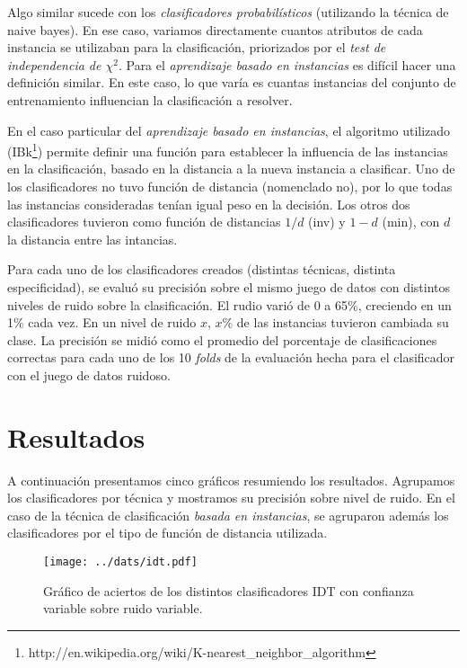 \documentclass[a4paper,10pt]{article}
\begin{document}
Algo similar sucede con los \emph{clasificadores probabilísticos} (utilizando la técnica de \textsf{naive bayes}). En ese caso, variamos directamente cuantos atributos de cada instancia se utilizaban para la clasificación, priorizados por el \emph{test de independencia de $\chi^2$}. Para el \emph{aprendizaje basado en instancias} es difícil hacer una definición similar. En este caso, lo que varía es cuantas instancias del conjunto de entrenamiento influencian la clasificación a resolver. 

En el caso particular del \emph{aprendizaje basado en instancias}, el algoritmo utilizado (\textsf{IBk}\footnote{http://en.wikipedia.org/wiki/K-nearest\_neighbor\_algorithm}) permite definir una función para establecer la influencia de las instancias en la clasificación, basado en la distancia a la nueva instancia a clasificar. Uno de los clasificadores no tuvo función de distancia (nomenclado \textsf{no}), por lo que todas las instancias consideradas tenían igual peso en la decisión. Los otros dos clasificadores tuvieron como función de distancias $1/d$ (\textsf{inv}) y $1-d$ (\textsf{min}), con $d$ la distancia entre las intancias. 

Para cada uno de los clasificadores creados (distintas técnicas, distinta especificidad), se evaluó su precisión sobre el mismo juego de datos con distintos niveles de ruido sobre la clasificación. El rudio varió de 0 a 65\%, creciendo en un 1\% cada vez. En un nivel de ruido $x$, $x$\% de las instancias tuvieron cambiada su clase. La precisión se midió como el promedio del porcentaje de clasificaciones correctas para cada uno de los 10 \emph{folds} de la evaluación hecha para el clasificador con el juego de datos ruidoso.

\section{Resultados}

A continuación presentamos cinco gráficos resumiendo los resultados. Agrupamos los clasificadores por técnica y mostramos su precisión sobre nivel de ruido. En el caso de la técnica de clasificación \emph{basada en instancias}, se agruparon además los clasificadores por el tipo de función de distancia utilizada. 

\begin{figure}[h]
\centering
\texttt{[image: ../dats/idt.pdf]}
\caption{Gráfico de aciertos de los distintos clasificadores \textsf{IDT} con confianza variable sobre ruido variable.}\label{fig:idt}
\end{figure}
\end{document}
